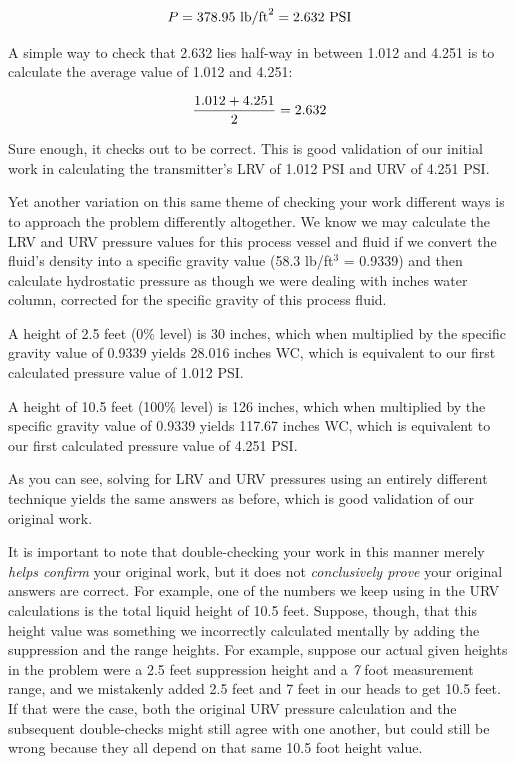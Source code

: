 $$P = 378.95 \hbox{ lb/ft}^2 = 2.632 \hbox{ PSI}$$

A simple way to check that 2.632 lies half-way in between 1.012 and 4.251 is to calculate the average value of 1.012 and 4.251:

$${{1.012 + 4.251} \over 2} = 2.632$$

Sure enough, it checks out to be correct.  This is good validation of our initial work in calculating the transmitter's LRV of 1.012 PSI and URV of 4.251 PSI.

\vskip 10pt

Yet another variation on this same theme of checking your work different ways is to approach the problem differently altogether.  We know we may calculate the LRV and URV pressure values for this process vessel and fluid if we convert the fluid's density into a specific gravity value (58.3 lb/ft$^{3}$ = 0.9339) and then calculate hydrostatic pressure as though we were dealing with inches water column, corrected for the specific gravity of this process fluid.

\vskip 10pt

A height of 2.5 feet (0\% level) is 30 inches, which when multiplied by the specific gravity value of 0.9339 yields 28.016 inches WC, which is equivalent to our first calculated pressure value of 1.012 PSI. 

\vskip 10pt

A height of 10.5 feet (100\% level) is 126 inches, which when multiplied by the specific gravity value of 0.9339 yields 117.67 inches WC, which is equivalent to our first calculated pressure value of 4.251 PSI.

\vskip 10pt

As you can see, solving for LRV and URV pressures using an entirely different technique yields the same answers as before, which is good validation of our original work.

\vskip 10pt

\filbreak

It is important to note that double-checking your work in this manner merely \textit{helps confirm} your original work, but it does not \textit{conclusively prove} your original answers are correct.  For example, one of the numbers we keep using in the URV calculations is the total liquid height of 10.5 feet.  Suppose, though, that this height value was something we incorrectly calculated mentally by adding the suppression and the range heights.  For example, suppose our actual given heights in the problem were a 2.5 feet suppression height and a \textit{7} foot measurement range, and we mistakenly added 2.5 feet and 7 feet in our heads to get 10.5 feet.  If that were the case, both the original URV pressure calculation and the subsequent double-checks might still agree with one another, but could still be wrong because they all depend on that same 10.5 foot height value.

